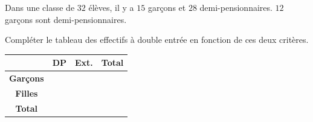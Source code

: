 \begin{exo}
	Dans une classe de $32$ élèves, il y a $15$ garçons et $28$ demi-pensionnaires. $12$ garçons sont demi-pensionnaires.


	Compléter le tableau des effectifs à double entrée en fonction de ces deux critères.

	\begin{center}
		\renewcommand{\arraystretch}{1.2}
		\begin{tabular}{|c|C{1cm}|C{1cm}|c|} \hline
			                 & \textbf{DP}  & \textbf{Ext.} & \textbf{Total} \\ \hline
			\textbf{Garçons} & \phantom{12} & \phantom{3}   & \phantom{15}   \\ \hline
			\textbf{Filles}  & \phantom{16} & \phantom{1}   & \phantom{17}   \\ \hline
			\textbf{Total}   & \phantom{28} & \phantom{4}   & \phantom{32}   \\ \hline
		\end{tabular}
	\end{center}
\end{exo}
